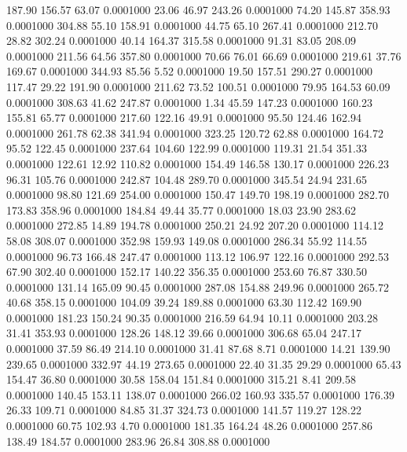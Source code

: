  187.90  156.57   63.07   0.0001000
  23.06   46.97  243.26   0.0001000
  74.20  145.87  358.93   0.0001000
 304.88   55.10  158.91   0.0001000
  44.75   65.10  267.41   0.0001000
 212.70   28.82  302.24   0.0001000
  40.14  164.37  315.58   0.0001000
  91.31   83.05  208.09   0.0001000
 211.56   64.56  357.80   0.0001000
  70.66   76.01   66.69   0.0001000
 219.61   37.76  169.67   0.0001000
 344.93   85.56    5.52   0.0001000
  19.50  157.51  290.27   0.0001000
 117.47   29.22  191.90   0.0001000
 211.62   73.52  100.51   0.0001000
  79.95  164.53   60.09   0.0001000
 308.63   41.62  247.87   0.0001000
   1.34   45.59  147.23   0.0001000
 160.23  155.81   65.77   0.0001000
 217.60  122.16   49.91   0.0001000
  95.50  124.46  162.94   0.0001000
 261.78   62.38  341.94   0.0001000
 323.25  120.72   62.88   0.0001000
 164.72   95.52  122.45   0.0001000
 237.64  104.60  122.99   0.0001000
 119.31   21.54  351.33   0.0001000
 122.61   12.92  110.82   0.0001000
 154.49  146.58  130.17   0.0001000
 226.23   96.31  105.76   0.0001000
 242.87  104.48  289.70   0.0001000
 345.54   24.94  231.65   0.0001000
  98.80  121.69  254.00   0.0001000
 150.47  149.70  198.19   0.0001000
 282.70  173.83  358.96   0.0001000
 184.84   49.44   35.77   0.0001000
  18.03   23.90  283.62   0.0001000
 272.85   14.89  194.78   0.0001000
 250.21   24.92  207.20   0.0001000
 114.12   58.08  308.07   0.0001000
 352.98  159.93  149.08   0.0001000
 286.34   55.92  114.55   0.0001000
  96.73  166.48  247.47   0.0001000
 113.12  106.97  122.16   0.0001000
 292.53   67.90  302.40   0.0001000
 152.17  140.22  356.35   0.0001000
 253.60   76.87  330.50   0.0001000
 131.14  165.09   90.45   0.0001000
 287.08  154.88  249.96   0.0001000
 265.72   40.68  358.15   0.0001000
 104.09   39.24  189.88   0.0001000
  63.30  112.42  169.90   0.0001000
 181.23  150.24   90.35   0.0001000
 216.59   64.94   10.11   0.0001000
 203.28   31.41  353.93   0.0001000
 128.26  148.12   39.66   0.0001000
 306.68   65.04  247.17   0.0001000
  37.59   86.49  214.10   0.0001000
  31.41   87.68    8.71   0.0001000
  14.21  139.90  239.65   0.0001000
 332.97   44.19  273.65   0.0001000
  22.40   31.35   29.29   0.0001000
  65.43  154.47   36.80   0.0001000
  30.58  158.04  151.84   0.0001000
 315.21    8.41  209.58   0.0001000
 140.45  153.11  138.07   0.0001000
 266.02  160.93  335.57   0.0001000
 176.39   26.33  109.71   0.0001000
  84.85   31.37  324.73   0.0001000
 141.57  119.27  128.22   0.0001000
  60.75  102.93    4.70   0.0001000
 181.35  164.24   48.26   0.0001000
 257.86  138.49  184.57   0.0001000
 283.96   26.84  308.88   0.0001000

